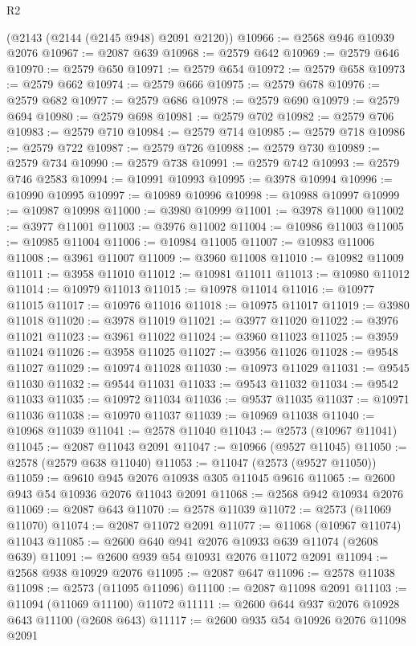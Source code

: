 \begin{lexlean}{R2}
\begin{coremodule}
    (@2143 (@2144 (@2145 @948) @2091 @2120))
@10966 := @2568 @946 @10939 @2076
@10967 := @2087 @639
@10968 := @2579 @642
@10969 := @2579 @646
@10970 := @2579 @650
@10971 := @2579 @654
@10972 := @2579 @658
@10973 := @2579 @662
@10974 := @2579 @666
@10975 := @2579 @678
@10976 := @2579 @682
@10977 := @2579 @686
@10978 := @2579 @690
@10979 := @2579 @694
@10980 := @2579 @698
@10981 := @2579 @702
@10982 := @2579 @706
@10983 := @2579 @710
@10984 := @2579 @714
@10985 := @2579 @718
@10986 := @2579 @722
@10987 := @2579 @726
@10988 := @2579 @730
@10989 := @2579 @734
@10990 := @2579 @738
@10991 := @2579 @742
@10993 := @2579 @746 @2583
@10994 := @10991 @10993
@10995 := @3978 @10994
@10996 := @10990 @10995
@10997 := @10989 @10996
@10998 := @10988 @10997
@10999 := @10987 @10998
@11000 := @3980 @10999
@11001 := @3978 @11000
@11002 := @3977 @11001
@11003 := @3976 @11002
@11004 := @10986 @11003
@11005 := @10985 @11004
@11006 := @10984 @11005
@11007 := @10983 @11006
@11008 := @3961 @11007
@11009 := @3960 @11008
@11010 := @10982 @11009
@11011 := @3958 @11010
@11012 := @10981 @11011
@11013 := @10980 @11012
@11014 := @10979 @11013
@11015 := @10978 @11014
@11016 := @10977 @11015
@11017 := @10976 @11016
@11018 := @10975 @11017
@11019 := @3980 @11018
@11020 := @3978 @11019
@11021 := @3977 @11020
@11022 := @3976 @11021
@11023 := @3961 @11022
@11024 := @3960 @11023
@11025 := @3959 @11024
@11026 := @3958 @11025
@11027 := @3956 @11026
@11028 := @9548 @11027
@11029 := @10974 @11028
@11030 := @10973 @11029
@11031 := @9545 @11030
@11032 := @9544 @11031
@11033 := @9543 @11032
@11034 := @9542 @11033
@11035 := @10972 @11034
@11036 := @9537 @11035
@11037 := @10971 @11036
@11038 := @10970 @11037
@11039 := @10969 @11038
@11040 := @10968 @11039
@11041 := @2578 @11040
@11043 := @2573 (@10967 @11041)
@11045 := @2087 @11043 @2091
@11047 := @10966 (@9527 @11045)
@11050 := @2578 (@2579 @638 @11040)
@11053 := @11047 (@2573 (@9527 @11050))
@11059 := @9610 @945 @2076 @10938 @305 @11045 @9616
@11065 := @2600 @943 @54 @10936 @2076 @11043 @2091
@11068 := @2568 @942 @10934 @2076
@11069 := @2087 @643
@11070 := @2578 @11039
@11072 := @2573 (@11069 @11070)
@11074 := @2087 @11072 @2091
@11077 := @11068 (@10967 @11074) @11043
@11085 := @2600 @640 @941 @2076 @10933 @639 @11074 (@2608 @639)
@11091 := @2600 @939 @54 @10931 @2076 @11072 @2091
@11094 := @2568 @938 @10929 @2076
@11095 := @2087 @647
@11096 := @2578 @11038
@11098 := @2573 (@11095 @11096)
@11100 := @2087 @11098 @2091
@11103 := @11094 (@11069 @11100) @11072
@11111 := @2600 @644 @937 @2076 @10928 @643 @11100 (@2608 @643)
@11117 := @2600 @935 @54 @10926 @2076 @11098 @2091

\end{coremodule}
\end{lexlean}
